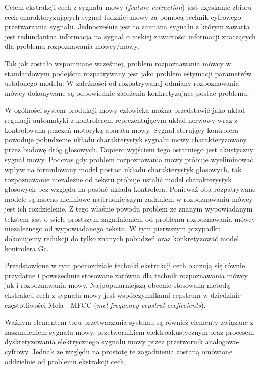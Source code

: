 Celem ekstrakcji cech z sygnału mowy (\textit{feature extraction}) jest uzyskanie zbioru cech charakteryzujących sygnał ludzkiej mowy za pomocą technik cyfrowego przetwarzania sygnału. Jednocześnie jest to zamiana sygnału z którym zawarta jest redundantna informacja na sygnał o niskiej zawartości informacji znaczących dla problemu rozpoznawania mówcy/mowy. 

Tak jak zostało wspomniane wcześniej, problem rozpoznawania mówcy w standardowym podejściu rozpatrywany jest jako problem estymacji parametrów ustalonego modelu. W zależności od rozpatrywanej odmiany rozpoznawania mówcy dokonywane są odpowiednie założenia konkretyzujące postać problemu.

W ogólności system produkcji mowy człowieka można przedstawić jako układ regulacji automatyki z kontrolerem reprezentującym układ nerwowy wraz z kontrolowaną przezeń motoryką aparatu mowy. Sygnał sterujący kontrolera powoduje pobudzenie układu charakterystyk sygnału mowy charakteryzowany przez budowę dróg głosowych. Dopiero wyjściem tego ostatniego jest akustyczny sygnał mowy. Podczas gdy problem rozpoznawania mowy próbuje wyeliminować wpływ na formułowany model postaci układu charakterystyk głosowych, tak rozpoznawanie niezależne od tekstu próbuje ustalić model charakterystyk głosowych bez względu na postać układu kontrolera. Ponieważ oba rozpatrywane modele są mocno nieliniowe najtrudniejszym zadaniem w rozpoznawaniu mówcy jest ich rozdzielenie. Z tego właśnie powodu problem ze znanym wypowiadanym tekstem jest o wiele prostszym zagadnieniem od problemu rozpoznawania mówcy niezależnego od wypowiadanego tekstu. W tym pierwszym przypadku dokonujemy redukcji do tylko znanych pobudzeń oraz konkretyzować model kontrolera Gc.

Przedstawione w tym podrozdziale techniki ekstrakcji cech okazują się równie przydatne i powszechnie stosowane zarówna dla technik rozpoznawania mówcy jak i rozpoznawania mowy. Najpopularniejszą obecnie stosowaną metodą ekstrakcji cech z sygnału mowy jest współczynnikami cepstrum w dziedzinie częstotliwości Mela -  MFCC (\textit{mel-frequency cepstral coeficcients}). 

Ważnym elementem toru przetwarzania systemu są również elementy związane z zaszumieniem sygnału mowy, przetwornikiem elektroakustycznym oraz procesem dyskretyzowania elektrycznego sygnału mowy przez przetwornik analogowo-cyfrowy. Jednak ze względu na prostotę te zagadnienia zostaną omówione oddzielnie od problemu ekstrakcji cech.

